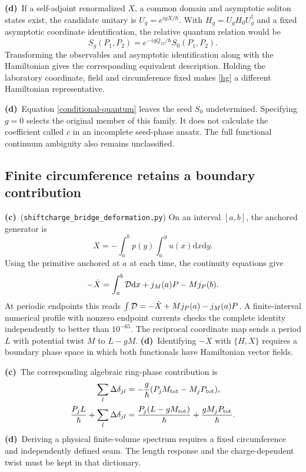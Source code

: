 \documentclass[11pt,a4paper]{article}
\newcommand{\C}{\textbf{(c)}\ }
\newcommand{\D}{\textbf{(d)}\ }
\newcommand{\dd}{\mathrm d}
\newcommand{\file}[1]{\nolinkurl{#1}}
\newcommand{\df}{\file{shiftcharge_bridge_deformation.py}}
\begin{document}
\D If a self-adjoint renormalized $X$, a common domain and asymptotic
soliton states exist, the candidate unitary is $U_g=e^{igX/\hbar}$.
With $H_g=U_gH_0U_g^\dagger$ and a fixed asymptotic coordinate
identification, the relative quantum relation would be
\begin{equation}
 S_g(P_1,P_2)=
 e^{-igQ_{12}/\hbar}S_0(P_1,P_2).
 \label{conditional-quantum}
\end{equation}
Transforming the observables and asymptotic identification along with the
Hamiltonian gives the corresponding equivalent description.
Holding the laboratory coordinate, field and circumference fixed makes
\eqref{hg} a different Hamiltonian representative.

\D Equation \eqref{conditional-quantum} leaves the seed $S_0$ undetermined.
Specifying $g=0$ selects the original member of this family. It does not
calculate the coefficient called $c$ in an incomplete seed-phase ansatz.
The full functional continuum ambiguity also remains unclassified.

\subsection{Finite circumference retains a boundary contribution}
\C (\df) On an interval $[a,b]$, the anchored generator is
\[
 X=-\int_a^b p(y)\int_a^y u(x)\dd x\dd y .
\]
Using the primitive anchored at $a$ at each time, the continuity equations give
\begin{equation}
 -\dot X=\int_a^b{\cal D}\dd x+j_M(a)P-Mj_P(b).
 \label{interval}
\end{equation}
At periodic endpoints this reads
$\int{\cal D}=-\dot X+Mj_P(a)-j_M(a)P$.
A finite-interval numerical profile with nonzero endpoint currents checks
the complete identity independently to better than $10^{-65}$.
The reciprocal coordinate map sends a period $L$ with potential twist $M$
to $L-gM$.
\D Identifying $-\dot X$ with $\{H,X\}$ requires a boundary phase space in
which both functionals have Hamiltonian vector fields.

\C The corresponding algebraic ring-phase contribution is
\begin{align}
 \sum_l\Delta\delta_{jl}
 &=-\frac g\hbar(P_jM_{\rm tot}-M_jP_{\rm tot}),\nonumber\\
 \frac{P_jL}{\hbar}+\sum_l\Delta\delta_{jl}
 &=\frac{P_j(L-gM_{\rm tot})}{\hbar}
   +\frac{gM_jP_{\rm tot}}{\hbar}.
 \label{ring-shift}
\end{align}
\D Deriving a physical finite-volume spectrum requires a fixed
circumference and independently defined seam. The length response and the
charge-dependent twist must be kept in that dictionary.
\end{document}
